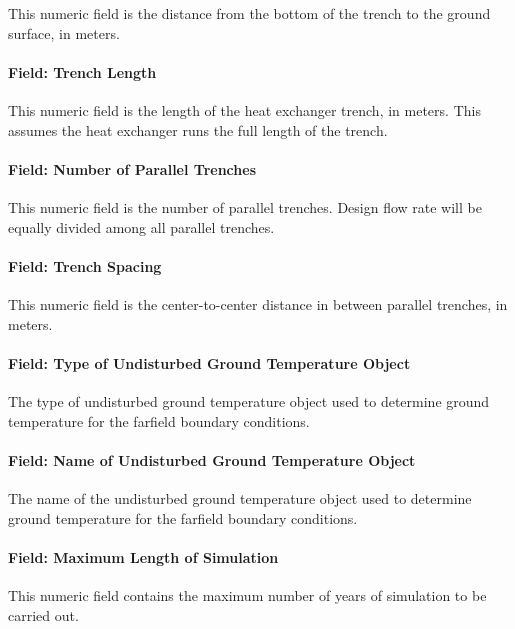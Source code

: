 This numeric field is the distance from the bottom of the trench to the ground surface, in meters.

\paragraph{Field: Trench Length}\label{field-trench-length}

This numeric field is the length of the heat exchanger trench, in meters. This assumes the heat exchanger runs the full length of the trench.

\paragraph{Field: Number of Parallel Trenches}\label{field-number-of-parallel-trenches}

This numeric field is the number of parallel trenches. Design flow rate will be equally divided among all parallel trenches.

\paragraph{Field: Trench Spacing}\label{field-trench-spacing}

This numeric field is the center-to-center distance in between parallel trenches, in meters.

\paragraph{Field: Type of Undisturbed Ground Temperature Object}

The type of undisturbed ground temperature object used to determine ground temperature for the farfield boundary conditions.

\paragraph{Field: Name of Undisturbed Ground Temperature Object}

The name of the undisturbed ground temperature object used to determine ground temperature for the farfield boundary conditions.

\paragraph{Field: Maximum Length of Simulation}\label{field-maximum-length-of-simulation-1}

This numeric field contains the maximum number of years of simulation to be carried out.

